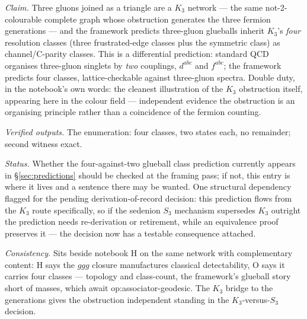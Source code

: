 \emph{Claim.} Three gluons joined as a triangle are a $K_{3}$ network --- the same
not-2-colourable complete graph whose obstruction generates the three fermion generations ---
and the framework predicts three-gluon glueballs inherit $K_{3}$'s \emph{four} resolution
classes (three frustrated-edge classes plus the symmetric class) as channel/C-parity classes.
This is a differential prediction: standard QCD organises three-gluon singlets by \emph{two}
couplings, $d^{abc}$ and $f^{abc}$; the framework predicts four classes, lattice-checkable
against three-gluon spectra. Double duty, in the notebook's own words: the cleanest
illustration of the $K_{3}$ obstruction itself, appearing here in the colour field ---
independent evidence the obstruction is an organising principle rather than a coincidence of
the fermion counting.

\emph{Verified outputs.} The enumeration: four classes, two states each, no remainder;
second witness exact.

\emph{Status.} Whether the four-against-two glueball class prediction currently appears in
\S\ref{sec:predictions} should be checked at the framing pass; if not, this entry is where it
lives and a sentence there may be wanted. One structural dependency flagged for the pending
derivation-of-record decision: this prediction flows from the $K_{3}$ route specifically, so if
the sedenion $S_{3}$ mechanism supersedes $K_{3}$ outright the prediction needs re-derivation
or retirement, while an equivalence proof preserves it --- the decision now has a testable
consequence attached.

\emph{Consistency.} Sits beside notebook H on the same network with complementary content: H
says the $ggg$ closure manufactures classical detectability, O says it carries four classes ---
topology and class-count, the framework's glueball story short of masses, which await
op:associator-geodesic. The $K_{3}$ bridge to the generations gives the obstruction independent
standing in the $K_{3}$-versus-$S_{3}$ decision.
